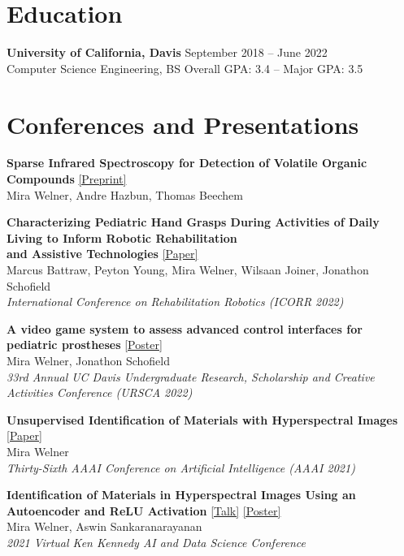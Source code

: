 \documentclass[a4paper]{comcv}
\begin{document}
\section{Education}
\begin{flushleft}
\textbf{University of California, Davis} \hfill September 2018 -- June 2022\\
Computer Science Engineering, BS \hfill Overall GPA: 3.4 -- Major GPA: 3.5
\end{flushleft}

\section{Conferences and Presentations}
\noindent\textbf{Sparse Infrared Spectroscopy for Detection of Volatile Organic Compounds }\href{https://arxiv.org/abs/2506.20678}{   [Preprint]}\\
\indent Mira Welner, Andre Hazbun, Thomas Beechem

\noindent \textbf{Characterizing Pediatric Hand Grasps During Activities of Daily Living to Inform
Robotic Rehabilitation \\and Assistive Technologies} \href{https://pubmed.ncbi.nlm.nih.gov/36176073/}{  [Paper]}\\
\indent Marcus Battraw, Peyton Young, Mira Welner, Wilsaan Joiner, Jonathon Schofield\\
\indent \textit{International Conference on Rehabilitation Robotics (ICORR 2022)}

\noindent \textbf{A video game system to assess advanced control interfaces for pediatric prostheses} \href{https://miraewelner.com/docs/schofield_presentation.pdf}{  [Poster]}\\
\indent Mira Welner, Jonathon Schofield\\
\indent \textit{33rd Annual UC Davis Undergraduate Research, Scholarship and Creative Activities Conference (URSCA 2022)}

\noindent \textbf{Unsupervised Identification of Materials with Hyperspectral Images }\href{https://ojs.aaai.org/index.php/AAAI/article/view/21708}{ [Paper]}\\
\indent Mira Welner\\
\indent \textit{Thirty-Sixth AAAI Conference on Artificial Intelligence (AAAI 2021)}

\noindent \textbf{Identification of Materials in Hyperspectral Images Using an Autoencoder and ReLU Activation } \href{https://youtu.be/CvCrZSAqwbI}{[Talk]}   \href{https://mirawelner.com/docs/rice_poster}{[Poster]}\\
\indent Mira Welner, Aswin Sankaranarayanan\\
\indent \textit{2021 Virtual Ken Kennedy AI and Data Science Conference}
\end{document}
